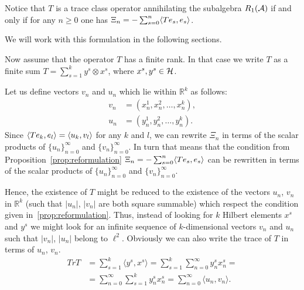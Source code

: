 \documentclass[12pt]{amsart}
\theoremstyle{case}
\begin{document}
  \begin{prop}
    \label{prop:reformulation}
    Notice that $T$ is a trace class operator annihilating the subalgebra $R_1(\cal{A})$ if and only if
      for any $n \geq 0$ one has $\Xi_n = -\sum_{s=0}^n \inner{Te_s}{e_s}$.
  \end{prop}
    We will work with this formulation in the following sections.

  Now assume that the operator $T$ has a finite rank.
  In that case we write $T$ as a finite sum $T = \sum_{s=1}^k y^s \otimes x^s$,
    where $x^s, y^s \in \cal{H}$.

  Let us define vectors $v_n$ and $u_n$ which lie within $\mathbb{R}^k$ as follows:
  \begin{align*}
    v_n &= (x^1_n, x^2_n, \dots, x^k_n),\\
    u_n &= (y^1_n, y^2_n, \dots, y^k_n).
  \end{align*}
  Since $\inner{Te_k}{e_l} = \inner{u_k}{v_l}$ for any $k$ and $l$, we can rewrite $\Xi_n$ in terms of
    the scalar products of $\{u_n\}_{n=0}^\infty$ and $\{v_n\}_{n=0}^\infty$.
  In turn that means that the condition from Proposition~\ref{prop:reformulation} $\Xi_n = -\sum_{s=0}^n \inner{Te_s}{e_s}$
    can be rewritten in terms of the scalar products of $\{u_n\}_{n=0}^\infty$ and $\{v_n\}_{n=0}^\infty$.

  Hence, the existence of $T$ might be reduced to the existence of
    the vectors $u_n$, $v_n$ in $\mathbb{R}^k$ (such that $\lvert u_n\rvert$, $\lvert v_n\rvert$ are both square summable)
    which respect the condition given in~\ref{prop:reformulation}.
  Thus, instead of looking for $k$ Hilbert elements $x^s$ and $y^s$ we might look for an infinite sequence
    of $k$-dimensional vectors $v_n$ and $u_n$ such that $\lvert v_n \rvert$, $\lvert u_n \rvert$ belong to $\ell^2$.
  Obviously we can also write the trace of $T$ in terms of $u_n$, $v_n$.
  \begin{align*}
    Tr T &= \sum_{s=1}^k \langle y^s, x^s \rangle = \sum_{s=1}^k \sum_{n=0}^\infty y^s_n x^s_n =\\
         &= \sum_{n=0}^\infty \sum_{s=1}^k y^s_n x^s_n = \sum_{n=0}^\infty \langle u_n, v_n \rangle.
  \end{align*}
\end{document}
